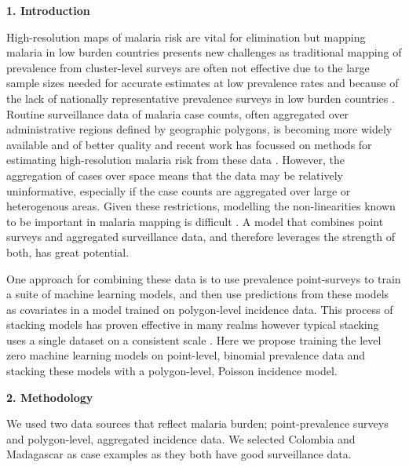 \documentclass[11pt]{article}
\begin{document}
\setlength{\parindent}{0pt}

{\bf 1. Introduction}



High-resolution maps of malaria risk are vital for elimination but mapping malaria in low burden countries presents new challenges as traditional mapping of prevalence from cluster-level surveys \citep{gething2011new, bhatt2017improved, gething2012long, bhatt2015effect} are often not effective due to the large sample sizes needed for accurate estimates at low prevalence rates and because of the lack of nationally representative prevalence surveys in low burden countries \citep{sturrock2016mapping, sturrock2014fine}. 
Routine surveillance data of malaria case counts, often aggregated over administrative regions defined by geographic polygons, is becoming more widely available and of better quality and recent work has focussed on methods for estimating high-resolution malaria risk from these data \citep{sturrock2014fine, wilson2017pointless, law2018variational, taylor2017continuous, li2012log}. 
However, the aggregation of cases over space means that the data may be relatively uninformative, especially if the case counts are aggregated over large or heterogenous areas. 
Given these restrictions, modelling the non-linearities known to be important in malaria mapping is difficult \cite{bhatt2017improved, bhatt2015effect}. 
A model that combines point surveys and aggregated surveillance data, and therefore leverages the strength of both, has great potential.
 
One approach for combining these data is to use prevalence point-surveys to train a suite of machine learning models, and then use predictions from these models as covariates in a model trained on polygon-level incidence data. 
This process of stacking models has proven effective in many realms however typical stacking uses a single dataset on a consistent scale \citep{sill2009feature, bhatt2017improved}. 
Here we propose training the level zero machine learning models on point-level, binomial prevalence data and stacking these models with a polygon-level, Poisson incidence model. 


{\bf 2. Methodology}

We used two data sources that reflect malaria burden; point-prevalence surveys and polygon-level, aggregated incidence data. 
We selected Colombia and Madagascar as case examples as they both have good surveillance data.
\end{document}
